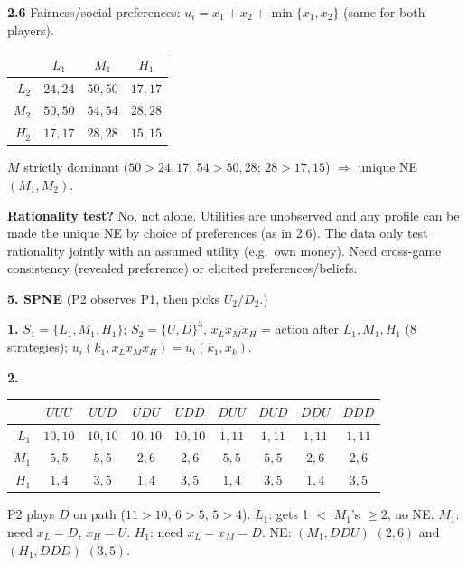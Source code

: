 \documentclass[12pt]{article}
\begin{document}
\textbf{2.6} Fairness/social preferences: $u_i=x_1+x_2+\min\{x_1,x_2\}$ (same for both players).
\begin{center}
\begin{tabular}{r|ccc}
 & $L_1$ & $M_1$ & $H_1$ \\ \hline
$L_2$ & $24,24$ & $50,50$ & $17,17$ \\
$M_2$ & $50,50$ & $54,54$ & $28,28$ \\
$H_2$ & $17,17$ & $28,28$ & $15,15$
\end{tabular}
\end{center}
$M$ strictly dominant ($50>24,17$; $54>50,28$; $28>17,15$) $\Rightarrow$ unique NE $(M_1,M_2)$.

\textbf{Rationality test?} No, not alone. Utilities are unobserved and any profile can be made the unique NE by choice of preferences (as in 2.6). The data only test rationality jointly with an assumed utility (e.g.\ own money). Need cross-game consistency (revealed preference) or elicited preferences/beliefs.

\medskip
\textbf{5. SPNE} (P2 observes P1, then picks $U_2/D_2$.)

\textbf{1.} $S_1=\{L_1,M_1,H_1\}$; $S_2=\{U,D\}^3$, $x_Lx_Mx_H$ = action after $L_1,M_1,H_1$ (8 strategies); $u_i(k_1,x_Lx_Mx_H)=u_i(k_1,x_k)$.

\textbf{2.}
\begin{center}
\small
\setlength{\tabcolsep}{3.5pt}
\begin{tabular}{r|cccccccc}
 & $UUU$ & $UUD$ & $UDU$ & $UDD$ & $DUU$ & $DUD$ & $DDU$ & $DDD$ \\ \hline
$L_1$ & $10,10$ & $10,10$ & $10,10$ & $10,10$ & $1,11$ & $1,11$ & $1,11$ & $1,11$ \\
$M_1$ & $5,5$ & $5,5$ & $2,6$ & $2,6$ & $5,5$ & $5,5$ & $2,6$ & $2,6$ \\
$H_1$ & $1,4$ & $3,5$ & $1,4$ & $3,5$ & $1,4$ & $3,5$ & $1,4$ & $3,5$
\end{tabular}
\end{center}
P2 plays $D$ on path ($11>10$, $6>5$, $5>4$). $L_1$: gets 1 $<$ $M_1$'s $\ge 2$, no NE. $M_1$: need $x_L=D$, $x_H=U$. $H_1$: need $x_L=x_M=D$.
NE: $(M_1,DDU)$ $(2,6)$ and $(H_1,DDD)$ $(3,5)$.
\end{document}
